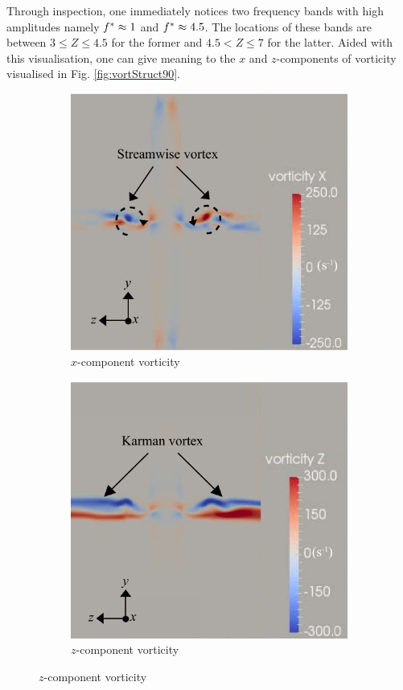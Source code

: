 \documentclass[oneside]{utmthesis}
\begin{document}
Through inspection, one immediately notices two frequency bands with high amplitudes namely $f^{*} \approx 1$ and $f^{*} \approx 4.5$. The locations of these bands are between $3 \leq Z \leq 4.5$ for the former and $4.5 < Z \leq 7$ for the latter. Aided with this visualisation, one can give meaning to the $x$ and $z$-components of vorticity visualised in Fig. \ref{fig:vortStruct90}.

\begin{figure}[!h]
  \centering
  \begin{subfigure}[h]{0.6\textwidth}
    \includegraphics[width=1\textwidth]{figs/vorx90}
    \caption{$x$-component vorticity}
    \label{fig:vorx90}
  \end{subfigure}

  \begin{subfigure}[h]{0.6\textwidth}
    \includegraphics[width=1\textwidth]{figs/vorz90}
    \caption{$z$-component vorticity}
    \label{fig:vorz90}
  \end{subfigure}


\end{figure}
\end{document}
